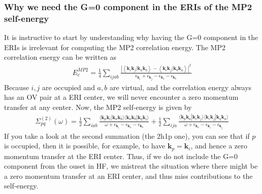 \subsubsection{Why we need the G=0 component in the ERIs of the MP2 self-energy}
It is instructive to start by understanding why having the G=0 component in the ERIs is irrelevant for computing the MP2 correlation energy. The MP2 correlation energy can be written as
\begin{align}
    E_{c}^{MP2} = \frac{1}{4} \sum_{ijab} \frac{|\left<\bm{k}_i \bm{k}_j|\bm{k}_a \bm{k}_b\right> - \left<\bm{k}_i \bm{k}_j|\bm{k}_b \bm{k}_a\right>|^2}{\epsilon_{\bm{k}_i} + \epsilon_{\bm{k}_j} - \epsilon_{\bm{k}_a} - \epsilon_{\bm{k}_b}}
\end{align}
Because $i,j$ are occupied and $a,b$ are virtual, and the correlation energy always has an OV pair at a ERI center, we will never encounter a zero momentum transfer at any center. Now, the MP2 self-energy is given by
\begin{align}
    \Sigma^{(2)}_{pq}(\omega) = \frac{1}{2} \sum_{iab} \frac{\langle \bm{k}_p \bm{k}_i|\bm{k}_a \bm{k}_b \rangle \langle \bm{k}_a \bm{k}_b|\bm{k}_q \bm{k}_i \rangle}{\omega + \epsilon_{\bm{k}_i} - \epsilon_{\bm{k}_a} - \epsilon_{\bm{k}_b}} + \frac{1}{2} \sum_{ija} \frac{\langle \bm{k}_p \bm{k}_a|\bm{k}_i \bm{k}_j \rangle \langle \bm{k}_i \bm{k}_j|\bm{k}_q \bm{k}_a \rangle}{\omega + \epsilon_{\bm{k}_a} - \epsilon_{\bm{k}_i} - \epsilon_{\bm{k}_j}}
\end{align}
If you take a look at the second summation (the 2h1p one), you can see that if $p$ is occupied, then it is possible, for example, to have $\bm{k}_p = \bm{k}_i$, and hence a zero momentum transfer at the ERI center. Thus, if we do not include the G=0 component from the ouset in HF, we mistreat the situation where there might be a zero momentum transfer at an ERI center, and thus miss contributions to the self-energy.
